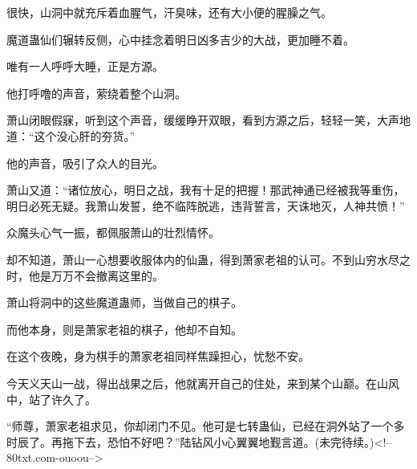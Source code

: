 \begin{this_body}
很快，山洞中就充斥着血腥气，汗臭味，还有大小便的腥臊之气。

魔道蛊仙们辗转反侧，心中挂念着明日凶多吉少的大战，更加睡不着。

唯有一人呼呼大睡，正是方源。

他打呼噜的声音，萦绕着整个山洞。

萧山闭眼假寐，听到这个声音，缓缓睁开双眼，看到方源之后，轻轻一笑，大声地道：“这个没心肝的夯货。”

他的声音，吸引了众人的目光。

萧山又道：“诸位放心，明日之战，我有十足的把握！那武神通已经被我等重伤，明日必死无疑。我萧山发誓，绝不临阵脱逃，违背誓言，天诛地灭，人神共愤！”

众魔头心气一振，都佩服萧山的壮烈情怀。

却不知道，萧山一心想要收服体内的仙蛊，得到萧家老祖的认可。不到山穷水尽之时，他是万万不会撤离这里的。

萧山将洞中的这些魔道蛊师，当做自己的棋子。

而他本身，则是萧家老祖的棋子，他却不自知。

在这个夜晚，身为棋手的萧家老祖同样焦躁担心，忧愁不安。

今天义天山一战，得出战果之后，他就离开自己的住处，来到某个山巅。在山风中，站了许久了。

“师尊，萧家老祖求见，你却闭门不见。他可是七转蛊仙，已经在洞外站了一个多时辰了。再拖下去，恐怕不好吧？”陆钻风小心翼翼地觐言道。(未完待续。)<!--80txt.com-ouoou-->

\end{this_body}

